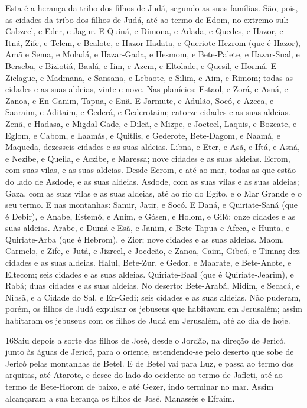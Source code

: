 Esta é a herança da tribo dos filhos de Judá, segundo as suas
famílias. São, pois, as cidades da tribo dos filhos de Judá,
até ao termo de Edom, no extremo sul: Cabzeel, e Eder, e Jagur.
E Quiná, e Dimona, e Adada, e Quedes, e Hazor, e Itnã,
Zife, e Telem, e Bealote, e Hazor-Hadata, e
Queriote-Hezrom (que é Hazor), Amã e Sema, e Moladá, e
Hazar-Gada, e Hesmom, e Bete-Palete, e Hazar-Sual, e Berseba,
e Biziotiá, Baalá, e Iim, e Azem, e Eltolade, e
Quesil, e Hormá. E Ziclague, e Madmana, e Sansana, e
Lebaote, e Silim, e Aim, e Rimom; todas as cidades e as suas
aldeias, vinte e nove. Nas planícies: Estaol, e Zorá, e Asná,
e Zanoa, e En-Ganim, Tapua, e Enã. E Jarmute, e
Adulão, Socó, e Azeca, e Saaraim, e Aditaim, e Gederá, e
Gederotaim; catorze cidades e as suas aldeias. Zenã, e
Hadasa, e Migdal-Gade, e Dileã, e Mizpe, e Jocteel,
Laquis, e Bozcate, e Eglom, e Cabom, e Laamás, e
Quitlis, e Gederote, Bete-Dagom, e Naamá, e Maqueda,
dezesseis cidades e as suas aldeias. Libna, e Eter, e Asã,
e Iftá, e Asná, e Nezibe, e Queila, e Aczibe, e
Maressa; nove cidades e as suas aldeias. Ecrom, com suas
vilas, e as suas aldeias. Desde Ecrom, e até ao mar, todas as
que estão do lado de Asdode, e as suas aldeias. Asdode, com
as suas vilas e as suas aldeias; Gaza, com as suas vilas e as suas
aldeias, até ao rio do Egito, e o Mar Grande e o seu termo. E
nas montanhas: Samir, Jatir, e Socó. E Daná, e Quiriate-Saná
(que é Debir), e Anabe, Estemó, e Anim, e Gósen, e
Holom, e Giló; onze cidades e as suas aldeias. Arabe, e Dumá
e Esã, e Janim, e Bete-Tapua e Afeca, e Hunta, e
Quiriate-Arba (que é Hebrom), e Zior; nove cidades e as suas
aldeias. Maom, Carmelo, e Zife, e Jutá, e Jizreel, e
Jocdeão, e Zanoa, Caim, Gibeá, e Timna; dez cidades e as suas
aldeias. Halul, Bete-Zur, e Gedor, e Maarate, e
Bete-Anote, e Eltecom; seis cidades e as suas aldeias.
Quiriate-Baal (que é Quiriate-Jearim), e Rabá; duas cidades e
as suas aldeias. No deserto: Bete-Arabá, Midim, e Secacá,
e Nibsã, e a Cidade do Sal, e En-Gedi; seis cidades e as suas
aldeias. Não puderam, porém, os filhos de Judá expulsar os
jebuseus que habitavam em Jerusalém; assim habitaram os jebuseus com
os filhos de Judá em Jerusalém, até ao dia de hoje.

\medskip

\lettrine{16} Saiu depois a sorte dos filhos de José, desde o
Jordão, na direção de Jericó, junto às águas de Jericó, para o
oriente, estendendo-se pelo deserto que sobe de Jericó pelas
montanhas de Betel. E de Betel vai para Luz, e passa ao termo
dos arquitas, até Atarote, e desce do lado do ocidente ao termo
de Jafleti, até ao termo de Bete-Horom de baixo, e até Gezer, indo
terminar no mar. Assim alcançaram a sua herança os filhos de
José, Manassés e Efraim.

